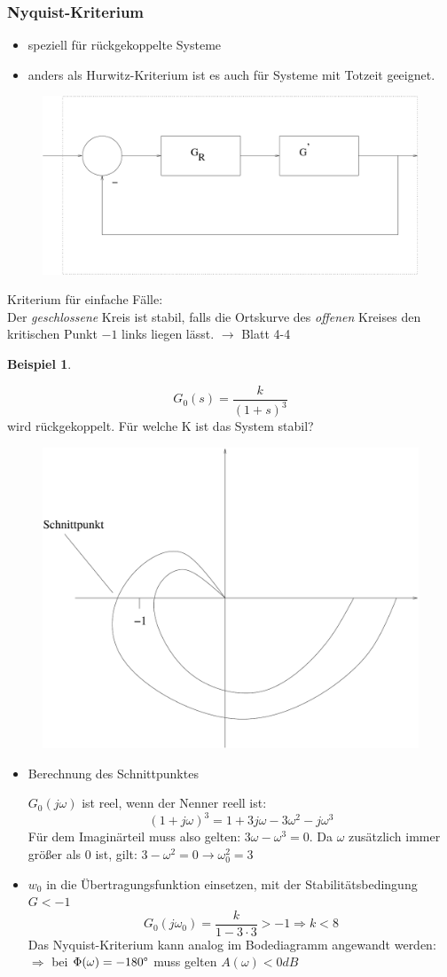 \documentclass[12pt,a4paper,ngerman]{scrartcl}
\newtheorem{bsp}{Beispiel}[section] %
\begin{document}
\subsubsection{Nyquist-Kriterium}

\begin{itemize}
\item speziell für rückgekoppelte Systeme
\item anders als Hurwitz-Kriterium ist es auch für Systeme mit Totzeit geeignet.
\end{itemize}

\begin{figure}[H]
\includegraphics[width=0.7\linewidth]{sysregel_nyquist}
\end{figure}
Kriterium für einfache Fälle:\\
Der \emph{geschlossene} Kreis ist stabil, falls die Ortskurve des \emph{offenen} Kreises den kritischen Punkt $-1$ links liegen lässt. $\rightarrow$ Blatt 4-4

\begin{bsp}
\end{bsp}
\[
G_0(s)=\frac{k}{(1+s)^3}
\]
wird rückgekoppelt. Für welche K ist das System stabil?
\begin{figure}[H]
  \centering
\includegraphics[width=.5\linewidth]{sysregel_bsp_4_3}  

\end{figure}
\begin{itemize}
\item Berechnung des Schnittpunktes

$G_0(j\omega)$ ist reel, wenn der Nenner reell ist:
\[
(1+j\omega)^3=1+3j\omega-3\omega^2-j\omega^3
\]
Für dem Imaginärteil muss also gelten: $3\omega-\omega^3=0$. Da $\omega$ zusätzlich immer größer als 0 ist, gilt: $3-\omega^2=0 \rightarrow \omega_0^2=3$
\item $w_0$ in die Übertragungsfunktion einsetzen, mit der Stabilitätsbedingung $G<-1$
\[
G_0(j\omega_0)=\frac{k}{1-3\cdot 3}>-1 \Rightarrow k<8
\] 
Das Nyquist-Kriterium kann analog im Bodediagramm angewandt werden:\\
$\Rightarrow$ bei $\Phi(\omega)=-180\degree$ muss gelten $A(\omega)<0dB$
\end{itemize}
\end{document}
